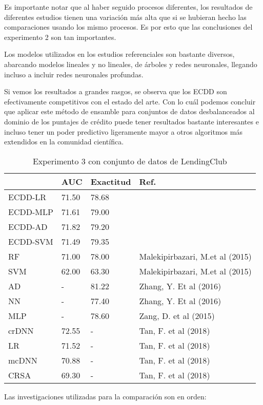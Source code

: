 Es importante notar que al haber seguido procesos diferentes, los resultados de diferentes estudios tienen una variación más alta que si se hubieran hecho las comparaciones usando los mismo procesos. Es por esto que las conclusiones del experimento 2 son tan importantes.

Los modelos utilizados en los estudios referenciales son bastante diversos, abarcando modelos lineales y no lineales, de árboles y redes neuronales, llegando incluso a incluir redes neuronales profundas.

Si vemos los resultados a grandes rasgos, se observa que los \ac{ECDD} son efectivamente competitivos con el estado del arte. Con lo cuál podemos concluir que aplicar este método de ensamble para conjuntos de datos desbalanceados al dominio de los puntajes de crédito puede tener resultados bastante interesantes e incluso tener un poder predictivo ligeramente mayor a otros algoritmos más extendidos en la comunidad científica.


\begin{table}[]
\centering
\caption{Experimento 3 con conjunto de datos de LendingClub}
\label{tab:lc-proc3}
\begin{tabularx}{\textwidth}{|l|Y Y l|}
				\hline
				& AUC			& Exactitud		& Ref.									\\
				\hline
ECDD-LR			& 71.50			& 78.68			&										\\		%
ECDD-MLP		& 71.61			& 79.00			&										\\		%
ECDD-AD			& 71.82			& 79.20			&										\\		%
ECDD-SVM		& 71.49			& 79.35			&										\\		%
				\hline
RF				& 71.00			& 78.00			& Malekipirbazari, M.et al (2015)		\\
SVM				& 62.00			& 63.30			& Malekipirbazari, M.et al (2015)		\\
AD				& -				& 81.22			& Zhang, Y. Et al (2016)				\\
NN				& -				& 77.40			& Zhang, Y. Et al (2016)				\\
MLP				& -				& 78.60			& Zang, D. et al (2015)					\\
crDNN			& 72.55			& -				& Tan, F. et al (2018)					\\
LR				& 71.52			& -				& Tan, F. et al (2018)					\\
mcDNN			& 70.88			& -				& Tan, F. et al (2018)					\\
CRSA			& 69.30			& -				& Tan, F. et al (2018)					\\
				\hline
\end{tabularx}
\par
\small
Las investigaciones utilizadas para la comparación son en orden: \citep{malekipirbazari2015risk, zhang2016research, zang2014credit, tan2018deep}
\end{table}


